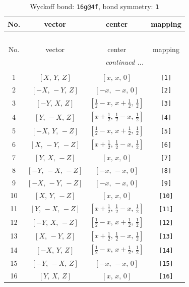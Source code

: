 \documentclass[fleqn,8pt]{jsarticle}
\begin{document}
\begin{longtable}{cccc}
\caption{Wyckoff bond: {\tt 16g@4f}, bond symmetry: {\tt 1}}
 \\
 \hline \hline
No. & vector & center & mapping \\ \hline \endfirsthead

\multicolumn{3}{l}{\tablename\ \thetable{}} \\
 \hline \hline
No. & vector & center & mapping \\ \hline \endhead

 \hline \hline
\multicolumn{3}{r}{\footnotesize\it continued ...} \\ \endfoot

 \hline \hline
\multicolumn{3}{r}{} \\ \endlastfoot

1 & $\left[ X,\, Y,\, Z \right]$ & $\left[ x,\, x,\, 0 \right]$ & {\tt [1]} \\ \hline
2 & $\left[ - X,\, - Y,\, Z \right]$ & $\left[ - x,\, - x,\, 0 \right]$ & {\tt [2]} \\ \hline
3 & $\left[ - Y,\, X,\, Z \right]$ & $\left[ \frac{1}{2} - x,\, x + \frac{1}{2},\, \frac{1}{2} \right]$ & {\tt [3]} \\ \hline
4 & $\left[ Y,\, - X,\, Z \right]$ & $\left[ x + \frac{1}{2},\, \frac{1}{2} - x,\, \frac{1}{2} \right]$ & {\tt [4]} \\ \hline
5 & $\left[ - X,\, Y,\, - Z \right]$ & $\left[ \frac{1}{2} - x,\, x + \frac{1}{2},\, \frac{1}{2} \right]$ & {\tt [5]} \\ \hline
6 & $\left[ X,\, - Y,\, - Z \right]$ & $\left[ x + \frac{1}{2},\, \frac{1}{2} - x,\, \frac{1}{2} \right]$ & {\tt [6]} \\ \hline
7 & $\left[ Y,\, X,\, - Z \right]$ & $\left[ x,\, x,\, 0 \right]$ & {\tt [7]} \\ \hline
8 & $\left[ - Y,\, - X,\, - Z \right]$ & $\left[ - x,\, - x,\, 0 \right]$ & {\tt [8]} \\ \hline
9 & $\left[ - X,\, - Y,\, - Z \right]$ & $\left[ - x,\, - x,\, 0 \right]$ & {\tt [9]} \\ \hline
10 & $\left[ X,\, Y,\, - Z \right]$ & $\left[ x,\, x,\, 0 \right]$ & {\tt [10]} \\ \hline
11 & $\left[ Y,\, - X,\, - Z \right]$ & $\left[ x + \frac{1}{2},\, \frac{1}{2} - x,\, \frac{1}{2} \right]$ & {\tt [11]} \\ \hline
12 & $\left[ - Y,\, X,\, - Z \right]$ & $\left[ \frac{1}{2} - x,\, x + \frac{1}{2},\, \frac{1}{2} \right]$ & {\tt [12]} \\ \hline
13 & $\left[ X,\, - Y,\, Z \right]$ & $\left[ x + \frac{1}{2},\, \frac{1}{2} - x,\, \frac{1}{2} \right]$ & {\tt [13]} \\ \hline
14 & $\left[ - X,\, Y,\, Z \right]$ & $\left[ \frac{1}{2} - x,\, x + \frac{1}{2},\, \frac{1}{2} \right]$ & {\tt [14]} \\ \hline
15 & $\left[ - Y,\, - X,\, Z \right]$ & $\left[ - x,\, - x,\, 0 \right]$ & {\tt [15]} \\ \hline
16 & $\left[ Y,\, X,\, Z \right]$ & $\left[ x,\, x,\, 0 \right]$ & {\tt [16]} \\
\end{longtable}
\end{document}
